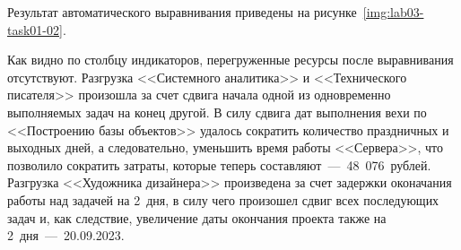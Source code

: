 
Результат автоматического выравнивания приведены на
рисунке~\ref{img:lab03-task01-02}.


Как видно по столбцу индикаторов, перегруженные ресурсы после выравнивания
отсутствуют. Разгрузка <<Системного аналитика>> и <<Технического писателя>>
произошла за счет сдвига начала одной из одновременно выполняемых задач на
конец другой. В силу сдвига дат выполнения вехи по <<Построению базы объектов>>
удалось сократить количество праздничных и выходных дней, а следовательно,
уменьшить время работы <<Сервера>>, что позволило сократить затраты, которые
теперь составляют~---~48~076~рублей. Разгрузка <<Художника дизайнера>>
произведена за счет задержки оконачания работы над задачей на 2~дня, в силу
чего произошел сдвиг всех последующих задач и, как следствие, увеличение даты
окончания проекта также на 2~дня~---~20.09.2023.
